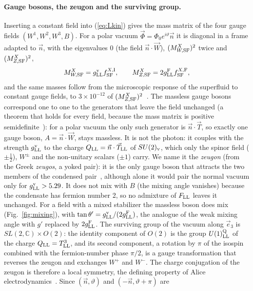 \documentclass[aps,prd,twocolumn,superscriptaddress,nofootinbib,floatfix,longbibliography]{revtex4-2}
\newcommand{\LL}{{\rm LL}}
\newcommand{\SF}{{\rm SF}}
\begin{document}
\paragraph*{Gauge bosons, the zeugon and the surviving group.}
Inserting a constant field into (\ref{eq:Lkin}) gives the mass matrix of the four gauge fields
$(W^1,W^2,W^3,B)$. For a polar vacuum $\vec\Phi=\Phi_0e^{i\vartheta}\vec n$ it is diagonal in a frame adapted to $\vec n$, with the
eigenvalues $0$ (the field $\vec n\cdot\vec W$), $(M^X_{W,\SF})^2$ twice and $(M^X_{Z,\SF})^2$,
\begin{equation}
M^X_{W,\SF}=g^{\rm v}_\LL f^{X,{\rm I}}_\SF ,\qquad M^X_{Z,\SF}=2g^{\rm F}_\LL f^{X,{\rm F}}_\SF ,
\label{eq:masses}
\end{equation}
and the same masses follow from the microscopic response of the superfluid to constant gauge fields, to
$3\times10^{-12}$ of $(M^X_{Z,\SF})^2$~\cite{SM}. The massless gauge bosons correspond one to one to the generators that leave the field
unchanged (a theorem that holds for every field, because the mass matrix is positive semidefinite~\cite{SM}): for a polar
vacuum the only such generator is $\vec n\cdot\vec T$, so exactly one gauge boson, $A=\vec n\cdot\vec W$, stays massless. It is not
the photon: it couples with the strength $g^{\rm v}_\LL$ to the charge $Q_\LL=\vec n\cdot\vec T_\LL$ of $SU(2)_{\rm v}$, which only
the spinor field ($\pm\frac12$), $W^\pm$ and the non-unitary scalars ($\pm1$) carry. We name it the \emph{zeugon} (from the
Greek \emph{zeugos}, a yoked pair): it is the only gauge boson that attracts the two members of the condensed
pair~\cite{SM}, although alone it would pair the normal vacuum only for $g^{\rm v}_\LL>5.29$. It does not mix with $B$
(the mixing angle vanishes) because the condensate has fermion number 2, so no admixture of $F_\LL$ leaves it unchanged. For
a field with a mixed stabilizer the massless boson does mix (Fig.~\ref{fig:mixing}), with $\tan\theta'=g^{\rm v}_\LL/(2g^{\rm F}_\LL)$,
the analogue of the weak mixing angle with $g'$ replaced by $2g^{\rm F}_\LL$. The surviving group of the vacuum along $\vec e_3$ is
$SL(2,\mathbb C)\times O(2)$: the identity component of $O(2)$ is the group $U(1)^{\rm Q}_\LL$ of the charge
$Q_\LL=T^3_\LL$, and its second component, a rotation by $\pi$ of the isospin combined with the fermion-number phase $\pi/2$,
is a gauge transformation that reverses the zeugon and exchanges $W^+$ and $W^-$. The charge conjugation of the zeugon is
therefore a local symmetry, the defining property of Alice
electrodynamics~\cite{Kiskis1978,Schwarz1982,BucherLoPreskill1992}. Since $(\vec n,\vartheta)$ and $(-\vec n,\vartheta+\pi)$ are
\end{document}
